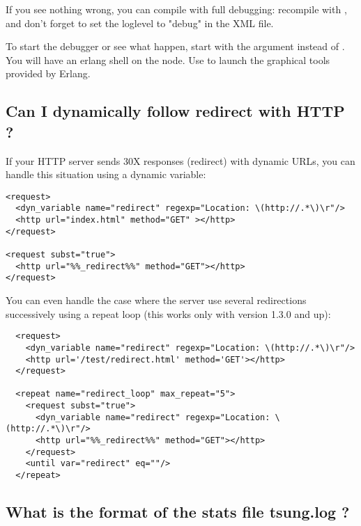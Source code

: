 \documentclass{TSUNG-en}
\begin{document}
\begin{appendix}
If you see nothing wrong, you can compile  with full
debugging: recompile with  , and
don't forget to set the loglevel to "debug" in the XML file.

To start the debugger or see what happen, start  with the
 argument instead of . You will have
an erlang shell on the  node. Use
 to launch the graphical tools provided by
Erlang.

\subsection{Can I dynamically follow redirect with HTTP ?}

If your HTTP server sends 30X responses (redirect) with dynamic URLs,
you can handle this situation using a dynamic variable:

\begin{Verbatim}
<request>
  <dyn_variable name="redirect" regexp="Location: \(http://.*\)\r"/>
  <http url="index.html" method="GET" ></http>
</request>

<request subst="true">
  <http url="%%_redirect%%" method="GET"></http>
</request>
\end{Verbatim}

You can even handle the case where the server use several redirections
successively using a repeat loop (this works only with version 1.3.0 and up):

\begin{Verbatim}
  <request>
    <dyn_variable name="redirect" regexp="Location: \(http://.*\)\r"/>
    <http url='/test/redirect.html' method='GET'></http>
  </request>

  <repeat name="redirect_loop" max_repeat="5">
    <request subst="true">
      <dyn_variable name="redirect" regexp="Location: \(http://.*\)\r"/>
      <http url="%%_redirect%%" method="GET"></http>
    </request>
    <until var="redirect" eq=""/>
  </repeat>
\end{Verbatim}

\subsection{What is the format of the stats file tsung.log ?}


\end{appendix}
\end{document}
